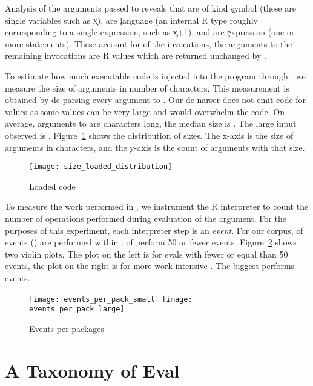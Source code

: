 \documentclass[USenglish,cleveref, autoref, thm-restate]{lipics-v2019}
\begin{document}
Analysis of the arguments passed to \eval reveals that \Symbolpercent
are of kind \c{symbol} (these are single variables such as \c{x}),
\Languagepercent are \c{language} (an internal R type roughly
corresponding to a single expression, such as \c{x+1}), and
\Expressionpercent are \c{expression} (one or more statements). These
account for \Codepercent of the invocations, the arguments to the
remaining invocations are R values which are returned unchanged by
\eval.

To estimate how much executable code is injected into the program
through \eval, we measure the size of arguments in number of
characters. This measurement is obtained by de-parsing every argument
to \eval. Our de-narser does not emit code for values as some values
can be very large and would overwhelm the code. On average, arguments
to \eval are \Avgszeval characters long, the median size is
\Medianszeval. The large input observed is \Maxszeval.
Figure~\ref{fig:sizedistribution} shows the distribution of sizes. The
x-axis is the size of arguments in characters, and the y-axis is the
count of arguments with that size.

\begin{figure}[h!]
 \texttt{[image: size\_loaded\_distribution]}
\caption{Loaded code} \label{fig:sizedistribution}
\end{figure}

To measure the work performed in \evals, we instrument the R
interpreter to count the number of operations performed during
evaluation of the argument. For the purposes of this experiment, each
interpreter step is an \emph{event}. For our corpus, \EvalEventAllPerc
of events (\EventsRnd) are performed within \eval. \Smalleventspct of
\evals perform 50 or fewer events. Figure~\ref{fig:eventsPerPackage}
shows two violin plots. The plot on the left is for evals with fewer
or equal than 50 events, the plot on the right is for more
work-intensive \evals. The biggest \eval performs \MaxeventsRnd
events.

\begin{figure}[h!]
	\centering
	\texttt{[image: events\_per\_pack\_small]}
	\texttt{[image: events\_per\_pack\_large]}
	\caption{Events per packages} \label{fig:eventsPerPackage}
\end{figure}




\section{A Taxonomy of Eval}
\end{document}
